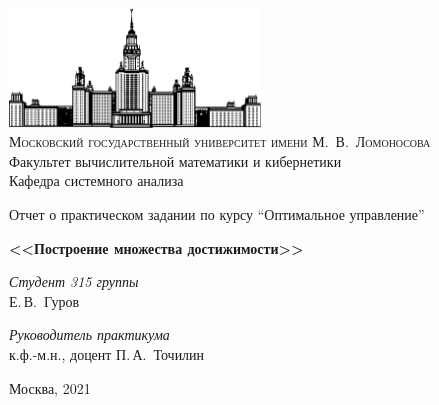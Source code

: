 \documentclass[11pt]{article}
\begin{document}
\thispagestyle{empty}

\begin{center}
\ \vspace{-3cm}

\includegraphics[width=0.5\textwidth]{msu.png}\\
{\scshape Московский государственный университет имени М.~В.~Ломоносова}\\
Факультет вычислительной математики и кибернетики\\
Кафедра системного анализа

\vfill

{\LARGE Отчет о практическом задании по курсу ``Оптимальное управление'' }

\vspace{1cm}

{\Huge\bfseries <<Построение множества достижимости>>}
\end{center}

\vspace{1cm}

\begin{flushright}
  \large
  \textit{Студент 315 группы}\\
  Е.\,В.~Гуров

  \vspace{5mm}

  \textit{Руководитель практикума}\\
  к.ф.-м.н., доцент П.\,А.~Точилин
\end{flushright}

\vfill

\begin{center}
Москва, 2021
\end{center}
\newpage

\tableofcontents
\newpage
\end{document}
